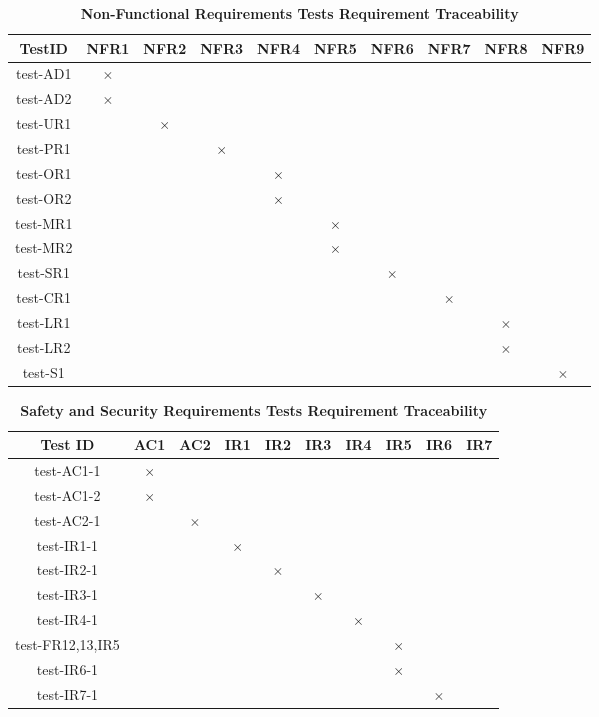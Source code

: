 \documentclass[12pt, titlepage]{article}
\begin{document}
\begin{table} [H]
  \centering
  \begin{tabular}{|c|c|c|c|c|c|c|c|c|c|}
    \hline
    TestID & NFR1 & NFR2 & NFR3 & NFR4 & NFR5 & NFR6 & NFR7 & NFR8 & NFR9 \\
    \hline
    test-AD1 & $\times$ & & & & & & & & \\
    \hline
    test-AD2 &  $\times$ & & & & & & & & \\
    \hline
    test-UR1 & & $\times$ &  & & & & & & \\
    \hline
    test-PR1 & & & $\times$ & & & & & & \\
    \hline
    test-OR1 & & & & $\times$ & & & & &  \\
    \hline
    test-OR2 & & & & $\times$ & & & & & \\
    \hline
    test-MR1 & & & & & $\times$ & & & &\\
    \hline
    test-MR2 & & & & & $\times$ & & & &  \\
    \hline
    test-SR1 & & & & & & $\times$ & & &\\
    \hline
    test-CR1 & & & & & & & $\times$ & &\\
    \hline
    test-LR1 & & & & & & & & $\times$ &\\
    \hline
    test-LR2 & & & & & & & & $\times$ & \\
    \hline
    test-S1 & & & & & & & & & $\times$ \\
    \hline
  \end{tabular}
\caption{\bf Non-Functional Requirements Tests Requirement Traceability} \label{tab:nfr-test-traceability}
\end{table}

\begin{table} [H]
  \centering
  \begin{tabular}{|c|c|c|c|c|c|c|c|c|c|}
  \hline
  Test ID & AC1 & AC2 & IR1 & IR2 & IR3 & IR4 & IR5 & IR6 & IR7 \\
  \hline
  test-AC1-1 & $\times$ & & & & & & &   \\
  \hline
  test-AC1-2 & $\times$ & & & & & & &   \\
  \hline
  test-AC2-1 & & $\times$ & & & & & &   \\
  \hline
  test-IR1-1 & & & $\times$ & & & & &   \\
  \hline
  test-IR2-1  & & & & $\times$ & & & &  \\
  \hline
  test-IR3-1  & & & & & $\times$ & & &  \\
  \hline
  test-IR4-1  & & & & & & $\times$ & &  \\
  \hline
  test-FR12,13,IR5  & & & & & & & $\times$ & & \\
  \hline
  test-IR6-1  & & & & & & &  $\times$ & \\
  \hline
  test-IR7-1  & & & & & & & &  $\times$ \\
  \hline
\end{tabular}
\caption{\bf Safety and Security Requirements Tests Requirement Traceability} \label{tab:sns-test-traceability}
\end{table}
\end{document}
